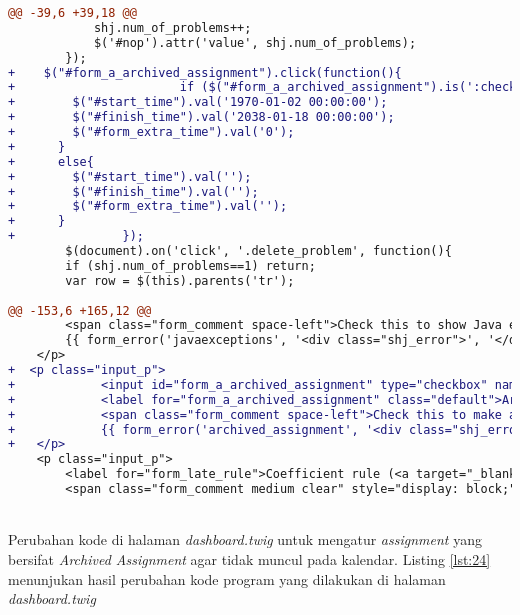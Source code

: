 \begin{lstlisting}[language=diff, caption=Perubahan kode program pada halaman \textit{add\_assignment.twig}, label=lst:23, basicstyle=\ttfamily, frame=single, columns=fullflexible, keepspaces=true, breaklines=true]
@@ -39,6 +39,18 @@
			shj.num_of_problems++;
			$('#nop').attr('value', shj.num_of_problems);
		});
+    $("#form_a_archived_assignment").click(function(){
+                       if ($("#form_a_archived_assignment").is(':checked')) {
+        $("#start_time").val('1970-01-02 00:00:00');
+        $("#finish_time").val('2038-01-18 00:00:00');
+        $("#form_extra_time").val('0');
+      }
+      else{
+        $("#start_time").val('');
+        $("#finish_time").val('');
+        $("#form_extra_time").val('');
+      }
+               });
		$(document).on('click', '.delete_problem', function(){
		if (shj.num_of_problems==1) return;
		var row = $(this).parents('tr');
		
@@ -153,6 +165,12 @@
		<span class="form_comment space-left">Check this to show Java exceptions to users</span>
		{{ form_error('javaexceptions', '<div class="shj_error">', '</div>') }}
	</p>
+  <p class="input_p">
+            <input id="form_a_archived_assignment" type="checkbox" name="archived_assignment" value="1" {{ edit ? (edit_assignment.archived_assignment ? 'checked') : set_checkbox('archived_assignment', '1')|raw }} />
+            <label for="form_a_archived_assignment" class="default">Archived Assignment</label>
+            <span class="form_comment space-left">Check this to make an archived assignment</span>
+            {{ form_error('archived_assignment', '<div class="shj_error">', '</div>') }}
+   </p>
	<p class="input_p">
		<label for="form_late_rule">Coefficient rule (<a target="_blank" href="https://github.com/mjnaderi/Sharif-Judge/blob/docs/v1.4/add_assignment.md#coefficient-rule">?</a>)</label><br>
		<span class="form_comment medium clear" style="display: block;">PHP script without &lt;?php ?&gt; tags</span>
\end{lstlisting}
~\\
Perubahan kode di halaman \textit{dashboard.twig} untuk mengatur \textit{assignment} yang bersifat \textit{Archived Assignment} agar tidak muncul pada kalendar. Listing \ref{lst:24} menunjukan hasil perubahan kode program yang dilakukan di halaman \textit{dashboard.twig}

